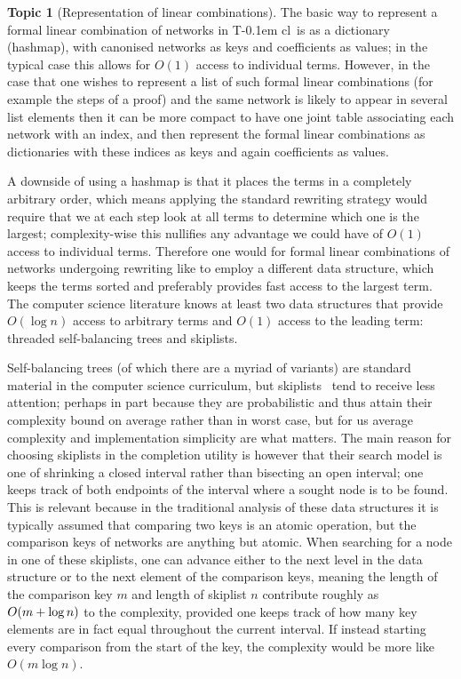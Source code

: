 \documentclass{article}
\theoremstyle{definition}
\newtheorem{topic}{Topic}
\newcommand{\Tcl}{T\kern-0.1em cl}
\begin{document}
\begin{topic}[Representation of linear combinations] 
  \label{Topic:LinComb}
  The basic way to represent a formal linear combination of networks 
  in \Tcl\ is as a dictionary (hashmap), with canonised networks as 
  keys and coefficients as values; in the typical case this allows 
  for $O(1)$ access to individual terms. However, in the case that 
  one wishes to represent a list of such formal linear combinations 
  (for example the steps of a proof) and the same network is likely 
  to appear in several list elements then it can be more compact to 
  have one joint table associating each network with an index, and 
  then represent the formal linear combinations as dictionaries with 
  these indices as keys and again coefficients as values.
  
  A downside of using a hashmap is that it places the terms in a 
  completely arbitrary order, which means applying the standard 
  rewriting strategy would require that we at each step look at all 
  terms to determine which one is the largest; complexity-wise this 
  nullifies any advantage we could have of $O(1)$ access to 
  individual terms. Therefore one would for formal linear 
  combinations of networks undergoing rewriting like to employ a 
  different data structure, which keeps the terms sorted and 
  preferably provides fast access to the largest term. The computer 
  science literature knows at least two data structures that provide 
  $O(\log n)$ access to arbitrary terms and $O(1)$ access to the 
  leading term: threaded self-balancing trees and skiplists.
  
  Self-balancing trees (of which there are a myriad of variants) are 
  standard material in the computer science curriculum, but 
  skiplists~\cite{skiplist} tend to receive less attention; perhaps 
  in part because they are probabilistic and thus attain their 
  complexity bound on average rather than in worst case, but for us 
  average complexity and implementation simplicity are what matters. 
  The main reason for choosing skiplists in the completion 
  utility is however that their search model is one of shrinking a 
  closed interval rather than bisecting an open interval; one keeps 
  track of both endpoints of the interval where a sought node is to 
  be found. This is relevant because in the traditional analysis 
  of these data structures it is typically assumed that comparing two 
  keys is an atomic operation, but the comparison keys of networks 
  are anything but atomic. When searching for a node in one of these 
  skiplists, one can advance either to the next level in the data 
  structure or to the next element of the comparison keys, meaning 
  the length of the comparison key $m$ and length of skiplist $n$ 
  contribute roughly as $O(m +\nobreak \log n)$ to the complexity, 
  provided one keeps track of how many key elements are in fact equal 
  throughout the current interval. If instead starting every 
  comparison from the start of the key, the complexity would be more 
  like $O(m \log n)$.
  

\end{topic}
\end{document}
